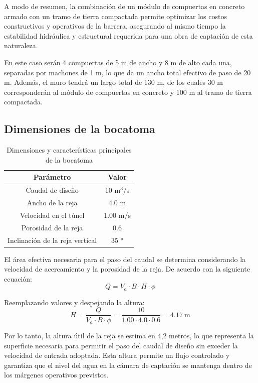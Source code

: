 \documentclass{article} %
\begin{document}
A modo de resumen, la combinación de un módulo de compuertas en concreto armado con un tramo de tierra compactada permite optimizar los costos constructivos y operativos de la barrera, asegurando al mismo tiempo la estabilidad hidráulica y estructural requerida para una obra de captación de esta naturaleza.

En este caso serán 4 compuertas de 5 m de ancho y 8 m de alto cada una, separadas por machones de 1 m, lo que da un ancho total efectivo de paso de 20 m. Además, el muro tendrá un largo total de 130 m, de los cuales 30 m corresponderán al módulo de compuertas en concreto y 100 m al tramo de tierra compactada.

\subsection{Dimensiones de la bocatoma}

\begin{table}[h]
    \centering
    \begin{tabular}{c c}
        \textbf{Parámetro} & \textbf{Valor} \\
        \hline
        Caudal de diseño & 10 m$^3$/s \\ 
        Ancho de la reja & 4.0 m \\
        Velocidad en el túnel & 1.00 m/s \\
        Porosidad de la reja & 0.6 \\
        Inclinación de la reja vertical & 35 ° \\ \hline
    \end{tabular}
    \caption{Dimensiones y características principales de la bocatoma}
\end{table}

El área efectiva necesaria para el paso del caudal se determina considerando la velocidad de acercamiento y la porosidad de la reja. De acuerdo con la siguiente ecuación:
\begin{equation}
    Q = V_a \cdot B \cdot H \cdot \phi
\end{equation}

Reemplazando valores y despejando la altura:
\begin{equation}
    H = \frac{Q}{V_a \cdot B \cdot \phi} = \frac{10}{1.00 \cdot 4.0 \cdot 0.6} = 4.17 \ \text{m}
\end{equation}

Por lo tanto, la altura útil de la reja se estima en 4,2 metros, lo que representa la superficie necesaria para permitir el paso del caudal de diseño sin exceder la velocidad de entrada adoptada. Esta altura permite un flujo controlado y garantiza que el nivel del agua en la cámara de captación se mantenga dentro de los márgenes operativos previstos.
\end{document}
